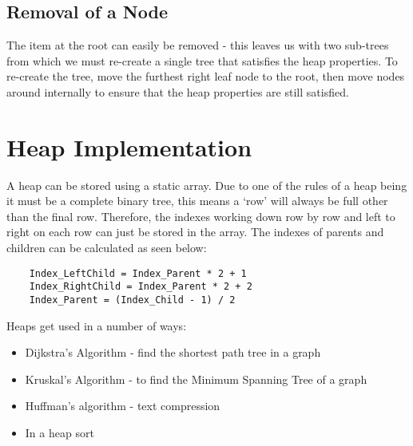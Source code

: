 \subsection{Removal of a Node}
The item at the root can easily be removed - this leaves us with two sub-trees from which we must re-create a single tree that satisfies the heap properties. To re-create the tree, move the furthest right leaf node to the root, then move nodes around internally to ensure that the heap properties are still satisfied.

\section{Heap Implementation}
A heap can be stored using a static array. Due to one of the rules of a heap being it must be a complete binary tree, this means a `row' will always be full other than the final row. Therefore, the indexes working down row by row and left to right on each row can just be stored in the array. The indexes of parents and children can be calculated as seen below:
\begin{verbatim}
    Index_LeftChild = Index_Parent * 2 + 1 
    Index_RightChild = Index_Parent * 2 + 2
    Index_Parent = (Index_Child - 1) / 2
\end{verbatim}

Heaps get used in a number of ways:
\begin{itemize}
    \item Dijkstra's Algorithm - find the shortest path tree in a graph
    \item Kruskal's Algorithm - to find the Minimum Spanning Tree of a graph
    \item Huffman's algorithm - text compression
    \item In a heap sort
\end{itemize}